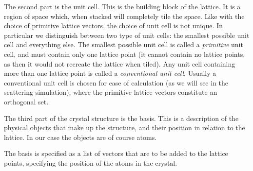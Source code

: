 \documentclass[main.tex]{subfiles}
\begin{document}
	The second part is the unit cell. This is the building block of the lattice. It is a region of space which, when stacked will completely tile the space. Like with the choice of primitive lattice vectors, the choice of unit cell is not unique. In particular we distinguish between two type of unit cells: the smallest possible unit cell and everything else. The smallest possible unit cell is called a \textit{primitive} unit cell, and must contain only one lattice point (it cannot contain no lattice points, as then it would not recreate the lattice when tiled). Any unit cell containing more than one lattice point is called a \textit{conventional unit cell}. Usually a conventional unit cell is chosen for ease of calculation (as we will see in the scattering simulation), where the primitive lattice vectors constitute an orthogonal set.
	
	The third part of the crystal structure is the basis. This is a description of the physical objects that make up the structure, and their position in relation to the lattice. In our case the objects are of course atoms. 
	
	The basis is specified as a list of vectors that are to be added to the lattice points, specifying the position of the atoms in the crystal.
	
\end{document}
